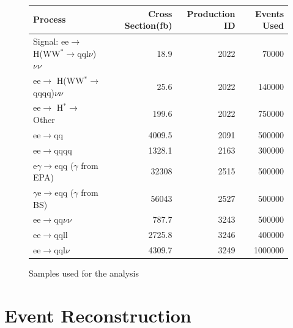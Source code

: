 \begin{figure}
  \centering
  \begin{tabular}{l r r r}
   \toprule
    Process     & Cross Section(fb)  &   Production ID\cite{bib-prodids}    & Events Used    \\
    \midrule
    Signal: ee$\rightarrow$ H(WW$^*\rightarrow$qql$\nu$)$\nu\nu$                & 18.9    &  2022\footnotemark[1]  & 70000  \\ 
    \midrule
    ee$\rightarrow$ H(WW$^*\rightarrow$qqqq)$\nu\nu$                & 25.6    &  2022\footnotemark[1]    & 140000 \\
    \midrule
    ee$\rightarrow$ H$^*\rightarrow$ Other & 199.6 & 2022\footnotemark[1] & 750000 \\
    \midrule
    ee$\rightarrow$qq               & 4009.5    &  2091  & 500000  \\ 
    \midrule
    ee$\rightarrow$qqqq               & 1328.1    &  2163  & 300000  \\ 
    \midrule
    e$\gamma$$\rightarrow$eqq ($\gamma$ from EPA)                 & 32308    &  2515\footnotemark[2] & 500000   \\ 
    \midrule
    $\gamma$e$\rightarrow$eqq ($\gamma$ from BS)               & 56043  &  2527\footnotemark[2]  & 500000 \\ 
    \midrule
    ee$\rightarrow$qq$\nu\nu$               & 787.7    &  3243 & 500000   \\ 
    \midrule
    ee$\rightarrow$qqll               & 2725.8    &  3246  & 400000  \\ 
    \midrule
    ee$\rightarrow$qql$\nu$              & 4309.7    &  3249 & 1000000   \\ 
    \bottomrule
  \end{tabular}
  \caption[Samples Used]{Samples used for the analysis}
  \label{fig:backgrounds}
\end{figure}


\section{Event Reconstruction}

